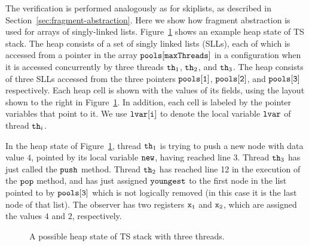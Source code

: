  The verification is performed analogously as for skiplists, as described
 in Section~\ref{sec:fragment-abstraction}. Here we show how fragment
 abstraction is used for arrays of singly-linked lists.
Figure~\ref{fig:tsshape} shows an  example heap state of TS stack.
The heap consists of a set of singly linked lists (SLLs), each of which
is accessed from a pointer in the array ${\tt pools[maxThreads]}$
in a configuration when %
it is accessed concurrently by three threads ${\tt th}_1$, ${\tt th}_2$, and ${\tt th}_3$. The heap consists of three SLLs accessed from the three pointers $\tt pools[1]$, $\tt pools[2]$, and $\tt pools[3]$ respectively. Each heap cell is
shown with the values of its fields, using the layout shown to the right in
Figure~\ref{fig:tsshape}.
In addition, each cell is labeled by the pointer variables that point to it.
We use ${\tt lvar[i]}$ to denote the local
variable ${\tt lvar}$ of thread ${\tt th}_i$.

In the heap state of Figure~\ref{fig:tsshape},
thread ${\tt th}_1$ is trying to push a new node with data value $4$, pointed by its local variable $\tt new$, having reached line 3.
Thread ${\tt th}_3$ has just called the ${\tt push}$ method.
Thread ${\tt th}_2$ has reached line 12 in the execution of the ${\tt pop}$ method,  and has just assigned ${\tt youngest}$ to the first node in the list
pointed to by $\tt pools[3]$ which is not logically removed (in this case it is the last node of that list).
The observer has two registers
$\tt x_1$ and $\tt x_2$, which are assigned the values $4$ and $2$,
respectively.

\begin{figure}
	
\caption{A possible heap state of TS stack with three threads.}
\label{fig:tsshape}
\end{figure} 

